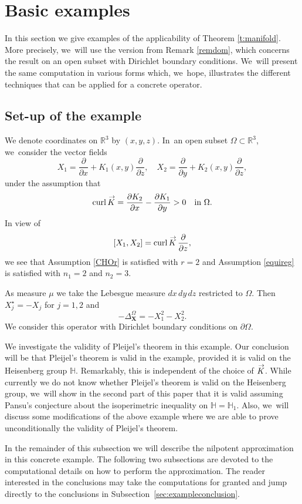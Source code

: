 \documentclass[10pt]{amsart}
\DeclareMathOperator{\curl}{curl}
\newcommand{\bX}{{\boldsymbol{X}}}
\renewcommand{\vec}[1]
{\overset{\,{\raisebox{-2pt}{$\scriptstyle\to$}}}{#1}}
\theoremstyle{definition}
\newcommand{\1}{\mathbbm{1}}
\newcommand{\R}{\mathbb{R}}
\begin{document}
\section{Basic examples}\label{AppA}

In this section we give examples of the applicability of Theorem \ref{t:manifold}. More precisely, we~will use the version from Remark \ref{remdom}, which concerns the result on an open subset with Dirichlet boundary conditions. We~will present the same computation in various forms which, we~hope, illustrates the different techniques that can be applied for a concrete operator.

\subsection{Set-up of the example}
We denote coordinates on $\R^3$ by $(x,y,z)$. In~an open subset $\Omega\subset\R^3$, we~consider the vector fields
\[
X_1= \frac{\partial}{\partial x} + K_1(x,y) \frac{\partial}{\partial z},
\quad
X_2= \frac{\partial}{\partial y} + K_2 (x,y) \frac{\partial}{\partial z},
\]
under the assumption that
\[
\curl \vec K = \frac{\partial K_2}{\partial x} - \frac{\partial K_1}{\partial y} >0
\quad\text{in}\ \Omega.
\]
In view of
\[
[X_1,X_2] = \curl \vec K \,\frac{\partial}{\partial z},
\]
we see that Assumption \ref{CHOr} is satisfied with $r=2$ and Assumption \ref{equireg} is satisfied with $n_1=2$ and $n_2=3$.

As measure $\mu$ we take the Lebesgue measure $dx\,dy\,dz$ restricted to $\Omega$. Then $X_j^\star = - X_j$ for $j=1,2$ and
\[
-\Delta_\bX^\Omega = - X_1^2- X_2^2.
\]
We consider this operator with Dirichlet boundary conditions on $\partial\Omega$.

We investigate the validity of Pleijel's theorem in this example. Our conclusion will be that Pleijel's theorem is valid in the example, provided it is valid on the Heisenberg group $\mathbb H$. Remarkably, this is independent of the choice of $\vec K$. While currently we do not know whether Pleijel's theorem is valid on the Heisenberg group, we~will show in the second part of this paper that it is valid assuming Pansu's conjecture about the isoperimetric inequality on $\mathbb H=\mathbb H_1$. Also, we~will discuss some modifications of the above example where we are able to prove unconditionally the validity of Pleijel's theorem.

In the remainder of this subsection we will describe the nilpotent approximation in this concrete example. The following two subsections are devoted to the computational details on how to perform the approximation. The reader interested in the conclusions may take the computations for granted and jump directly to the conclusions in Subsection~\ref{sec:exampleconclusion}.
\end{document}
